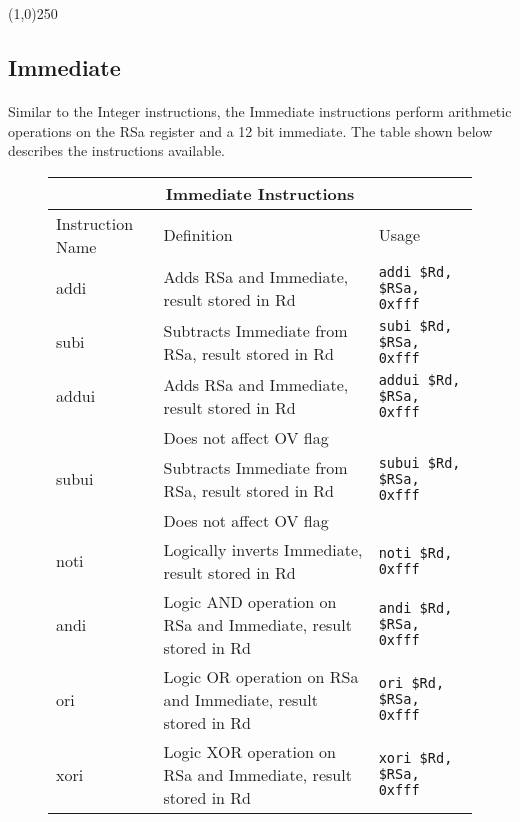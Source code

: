 \documentclass[letterpaper, 11pt]{article}
\begin{document}
\begin{center}
	\line(1,0){250}
\end{center}
\clearpage
\subsection{Immediate}
\paragraph{} Similar to the Integer instructions, the Immediate instructions perform arithmetic operations on the RSa register and a 12 bit immediate.
The table shown below describes the instructions available.



\begin{figure}[!h]
	\begin{center}
		\begin{tabular}{|l|l|l|}
			\hline
			\multicolumn{3}{c}{Immediate Instructions} \\ \hline
			Instruction Name	& Definition															& Usage 							\\ \hline
			addi				& Adds RSa and Immediate, result stored in Rd							& \texttt{addi \$Rd, \$RSa, 0xfff}	\\ \hline
			subi				& Subtracts Immediate from RSa, result stored in Rd						& \texttt{subi \$Rd, \$RSa, 0xfff}	\\ \hline
			addui 				& Adds RSa and Immediate, result stored in Rd 							& \texttt{addui \$Rd, \$RSa, 0xfff}	\\ 
			\hfill				& Does not affect OV flag												& \hfill 							\\ \hline
			subui 				& Subtracts Immediate from RSa, result stored in Rd						& \texttt{subui \$Rd, \$RSa, 0xfff}	\\ 
			\hfill				& Does not affect OV flag												& \hfill 							\\ \hline
			noti				& Logically inverts Immediate, result stored in Rd						& \texttt{noti \$Rd, 	0xfff}		\\ \hline
			andi				& Logic AND operation on RSa and Immediate, result stored in Rd			& \texttt{andi \$Rd, \$RSa, 0xfff}	\\ \hline	
			ori					& Logic OR operation on RSa and Immediate, result stored in Rd			& \texttt{ori \$Rd, \$RSa, 0xfff}	\\ \hline	
			xori				& Logic XOR operation on RSa and Immediate, result stored in Rd			& \texttt{xori \$Rd, \$RSa, 0xfff}	\\ \hline	

\end{tabular}
\end{center}
\end{figure}
\end{document}
